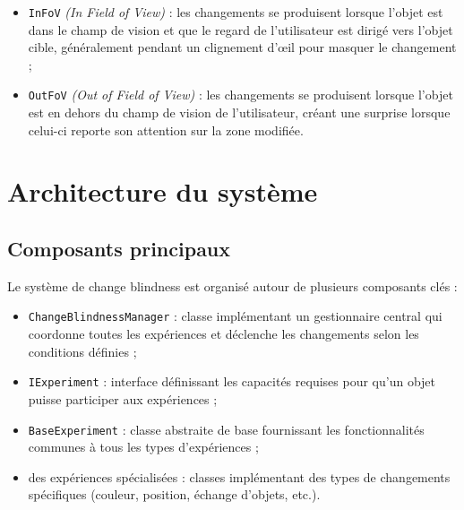 \documentclass[12pt]{report}
\begin{document}
\begin{itemize}
    \vspace{2mm}
    \item \texttt{InFoV} \textit{(In Field of View)} : les changements se produisent lorsque l'objet est dans le champ de vision et que le regard de l'utilisateur est dirigé vers l'objet cible, généralement pendant un clignement d'œil pour masquer le changement ;
    \vspace{2mm}
    \item \texttt{OutFoV} \textit{(Out of Field of View)} : les changements se produisent lorsque l'objet est en dehors du champ de vision de l'utilisateur, créant une surprise lorsque celui-ci reporte son attention sur la zone modifiée.
    \vspace{2mm}
\end{itemize}

\section{Architecture du système}
\subsection{Composants principaux}
Le système de change blindness est organisé autour de plusieurs composants clés :

\begin{itemize}
    \vspace{2mm}
    \item \texttt{ChangeBlindnessManager} : classe implémentant un gestionnaire central qui coordonne toutes les expériences et déclenche les changements selon les conditions définies ;
    \vspace{2mm}
    \item \texttt{IExperiment} : interface définissant les capacités requises pour qu'un objet puisse participer aux expériences ;
    \vspace{2mm}
    \item \texttt{BaseExperiment} : classe abstraite de base fournissant les fonctionnalités communes à tous les types d'expériences ;
    \vspace{2mm}
    \item des expériences spécialisées : classes implémentant des types de changements spécifiques (couleur, position, échange d'objets, etc.).
    \vspace{2mm}
\end{itemize}
\end{document}
